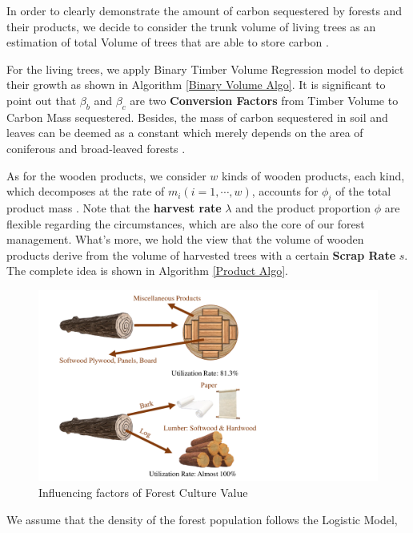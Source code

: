 \documentclass{mcmthesis}
\numberwithin{figure}{section}
\numberwithin{table}{section}
\numberwithin{equation}{section}
\begin{document}
In order to clearly demonstrate the amount of carbon sequestered by forests and their
products, we decide to consider the trunk volume of living trees as an estimation of 
total Volume of trees that are able to store carbon \citep{WangYan}. 
\par
For the living trees, we apply Binary Timber Volume Regression model \citep{LuoQingbang} 
to depict their growth as shown in Algorithm \ref{Binary Volume Algo}. 
It is significant
to point out that $ \beta_b $ and $ \beta_c $ are two \textbf{Conversion Factors} from
Timber Volume to Carbon Mass sequestered. Besides, the mass of carbon sequestered in
soil and leaves can be deemed as a constant which merely depends on the area
of coniferous and broad-leaved forests \citep{YanDeren2011}. 
\par
As for the wooden products, we consider $ w $ kinds of wooden products, each kind,
which decomposes at the rate of $ m_i (i = 1,\cdots, w) $, accounts for $ \phi_i$ 
of the total product mass \citep{2006Forest}. Note that the \textbf{harvest rate} $ \lambda $ and the product
proportion $ \phi $ are flexible regarding the circumstances, which are also 
the core of our forest management. What's more, we hold the view that 
the volume of wooden products derive from the volume of harvested trees with a certain
\textbf{Scrap Rate} $ s $. The complete idea is shown in Algorithm \ref{Product Algo}.
\par
\begin{figure}[htbp]
  \centering
\includegraphics[width = 12cm]{code&pic/Roundwood cutting ways.pdf}
  \caption{Influencing factors of Forest Culture Value}
\end{figure}
We assume that the density of the forest population follows the Logistic Model, 
\end{document}
